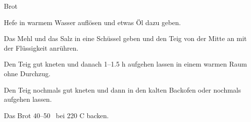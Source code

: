 
\begin{recipe}[]{Brot}{}{}



\step%
Hefe in warmem Wasser aufl\"osen und etwas \"Ol dazu geben.

\step%
Das Mehl und das Salz in eine Sch\"ussel geben und den Teig von der Mitte an
mit der Fl\"ussigkeit anr\"uhren.

\step%
Den Teig gut kneten und danach 1--1.5 h aufgehen lassen in einem warmen Raum
ohne Durchzug.

\step%
Den Teig nochmals gut kneten und dann in den kalten Backofen oder nochmals
aufgehen lassen.

\step%
Das Brot 40--50 \min~bei 220 C backen.


\end{recipe}
